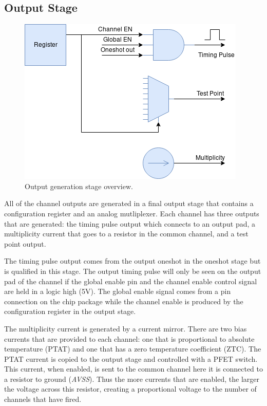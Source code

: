 \documentclass[12pt,oneside,final]{siuethesis}
\theoremstyle{definition}
\begin{document}
\subsection{Output Stage}
\begin{figure}[ht]
\centering
\includegraphics[scale=.6,keepaspectratio=true]{images/output_stage.png} 
\caption{Output generation stage overview.}
\label{fig:output-stage}
\end{figure}
\par All of the channel outputs are generated in a final output stage that contains a configuration register and an analog mutliplexer. Each channel has three outputs that are generated: the timing pulse output which connects to an output pad, a multiplicity current that goes to a resistor in the common channel, and a test point output.
\par The timing pulse output comes from the output oneshot in the oneshot stage but is qualified in this stage. The output timing pulse will only be seen on the output pad of the channel if the global enable pin and the channel enable control signal are held in a logic high (5V). The global enable signal comes from a pin connection on the chip package while the channel enable is produced by the configuration register in the output stage.
\par The multiplicity current is generated by a current mirror. There are two bias currents that are provided to each channel: one that is proportional to absolute temperature (PTAT) and one that has a zero temperature coefficient (ZTC). The PTAT current is copied to the output stage and controlled with a PFET switch. This current, when enabled, is sent to the common channel here it is connected to a resistor to ground (\emph{AVSS}). Thus the more currents that are enabled, the larger the voltage across this resistor, creating a proportional voltage to the number of channels that have fired.
\end{document}
